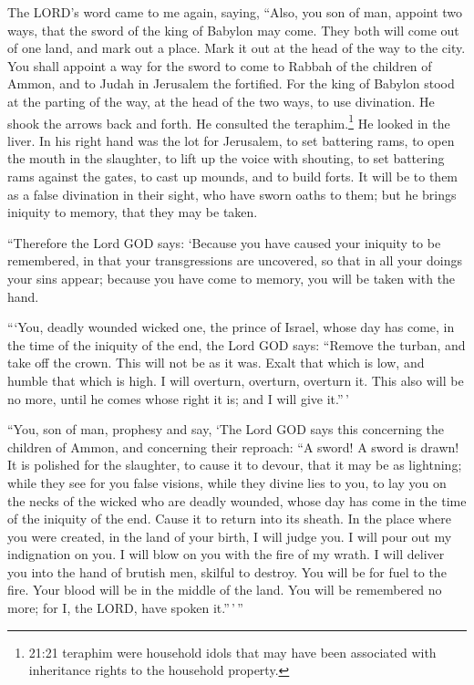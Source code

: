  The LORD's word came to me again, saying, 
``Also, you son of man, appoint two ways, that the sword of the king of
Babylon may come. They both will come out of one land, and mark out a
place. Mark it out at the head of the way to the city.  You
shall appoint a way for the sword to come to Rabbah of the children of
Ammon, and to Judah in Jerusalem the fortified.  For the
king of Babylon stood at the parting of the way, at the head of the two
ways, to use divination. He shook the arrows back and forth. He
consulted the teraphim.\footnote{21:21 teraphim were household idols
  that may have been associated with inheritance rights to the household
  property.} He looked in the liver.  In his right hand was
the lot for Jerusalem, to set battering rams, to open the mouth in the
slaughter, to lift up the voice with shouting, to set battering rams
against the gates, to cast up mounds, and to build forts. 
It will be to them as a false divination in their sight, who have sworn
oaths to them; but he brings iniquity to memory, that they may be taken.

 ``Therefore the Lord GOD says: `Because you have caused
your iniquity to be remembered, in that your transgressions are
uncovered, so that in all your doings your sins appear; because you have
come to memory, you will be taken with the hand.

 ```You, deadly wounded wicked one, the prince of Israel,
whose day has come, in the time of the iniquity of the end,
 the Lord GOD says: ``Remove the turban, and take off the
crown. This will not be as it was. Exalt that which is low, and humble
that which is high.  I will overturn, overturn, overturn
it. This also will be no more, until he comes whose right it is; and I
will give it.''\,'

 ``You, son of man, prophesy and say, `The Lord GOD says
this concerning the children of Ammon, and concerning their reproach:
``A sword! A sword is drawn! It is polished for the slaughter, to cause
it to devour, that it may be as lightning;  while they see
for you false visions, while they divine lies to you, to lay you on the
necks of the wicked who are deadly wounded, whose day has come in the
time of the iniquity of the end.  Cause it to return into
its sheath. In the place where you were created, in the land of your
birth, I will judge you.  I will pour out my indignation on
you. I will blow on you with the fire of my wrath. I will deliver you
into the hand of brutish men, skilful to destroy.  You will
be for fuel to the fire. Your blood will be in the middle of the land.
You will be remembered no more; for I, the LORD, have spoken
it.''\,'\,''

